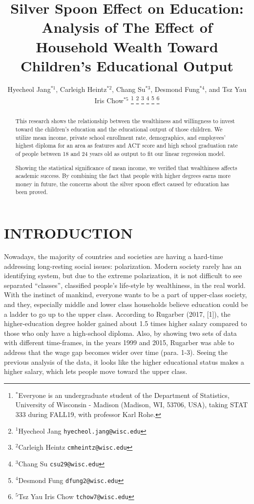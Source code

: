 \documentclass[letterpaper, 10 pt, conference]{ieeeconf}  %
\title{\LARGE \bf
Silver Spoon Effect on Education: Analysis of The Effect of Household Wealth Toward Children's Educational Output
}
\author{Hyecheol Jang$^{*1}$, Carleigh Heintz$^{*2}$, Chang Su$^{*3}$, Desmond Fung$^{*4}$, and Tsz Yau Iris Chow$^{*5}$%
\thanks{$^{*}$Everyone is an undergraduate student of the Department of  Statistics, University of Wisconsin - Madison (Madison, WI, 53706, USA), taking STAT 333 during FALL19, with professor Karl Rohe.}%
\thanks{$^{1}$Hyecheol Jang
        {\tt\small hyecheol.jang@wisc.edu}}%
\thanks{$^{2}$Carleigh Heintz
        {\tt\small cmheintz@wisc.edu}}%
\thanks{$^{3}$Chang Su
        {\tt\small csu29@wisc.edu}}%
\thanks{$^{4}$Desmond Fung
        {\tt\small dfung2@wisc.edu}}%
\thanks{$^{5}$Tsz Yau Iris Chow
        {\tt\small tchow7@wisc.edu}}%
}
\begin{document}
\maketitle
\thispagestyle{empty}
\pagestyle{empty}


\begin{abstract}

This research shows the relationship between the wealthiness and willingness to invest toward the children's education and the educational output of those children.
We utilize mean income, private school enrollment rate, demographics, and employees' highest diploma for an area as features and ACT score and high school graduation rate of people between 18 and 24 years old as output to fit our linear regression model.

Showing the statistical significance of mean income, we verified that wealthiness affects academic success.
By combining the fact that people with higher degrees earns more money in future, the concerns about the silver spoon effect caused by education has been proved.

\end{abstract}


\section{INTRODUCTION}

Nowadays, the majority of countries and societies are having a hard-time addressing long-resting social issues: polarization.
Modern society rarely has an identifying system, but due to the extreme polarization, it is not difficult to see separated “classes”, classified people’s life-style by wealthiness, in the real world.
With the instinct of mankind, everyone wants to be a part of upper-class society, and they, especially middle and lower class households believe education could be a ladder to go up to the upper class.
According to Rugarber (2017, [1]), the higher-education degree holder gained about 1.5 times higher salary compared to those who only have a high-school diploma.
Also, by showing two sets of data with different time-frames, in the years 1999 and 2015, Rugarber was able to address that the wage gap becomes wider over time (para. 1-3).
Seeing the previous analysis of the data, it looks like the higher educational status makes a higher salary, which lets people move toward the upper class.
\end{document}
